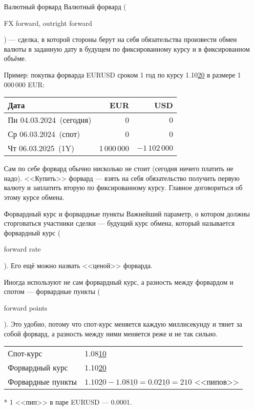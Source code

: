 \documentclass{beamer}
\newcommand{\en}[1]{\begin{otherlanguage}{english}#1\end{otherlanguage}}
\newcommand{\eurusdBigFigures}{1.08}
\newcommand{\eurusdBigFiguresPlusTwo}{1.10}
\newcommand{\eurusdBigFiguresPlusTwoPerMillion}{1\,10}
\newcommand{\eurusdBusinessDate}{Пн 04.03.2024}
\newcommand{\eurusdSpotDate}{Ср 06.03.2024}
\newcommand{\eurusdOneYearDate}{Чт 06.03.2025}
\begin{document}
\begin{frame}{Валютный форвард}
\justify
\alert{Валютный форвард} (\en{FX forward, outright forward}) --- сделка, в которой стороны берут 
на себя обязательства произвести обмен валюты в заданную дату в будущем по 
фиксированному курсу и в фиксированном объёме. 

\justify
Пример: покупка форварда EURUSD сроком 1 год по курсу \eurusdBigFiguresPlusTwo\underline{20} в размере 1\,000\,000 EUR:

\centering
\begin{tabular}{l|r|r}
Дата                          & EUR & USD \\ \hline
\eurusdBusinessDate\ (сегодня)  & 0   & 0   \\
\eurusdSpotDate\ (спот) & 0   & 0   \\
\eurusdOneYearDate\ (1Y)   & 1\,000\,000 & $-\eurusdBigFiguresPlusTwoPerMillion 2\,000$
\end{tabular}

\justify
Сам по себе форвард обычно нисколько не стоит (сегодня ничего платить не надо). <<Купить>> форвард --- взять на себя обязательство получить первую валюту и заплатить вторую по фиксированному курсу. Главное договориться об этому курсе обмена.
\end{frame}



\begin{frame}{Форвардный курс и форвардные пункты}
\justify
Важнейший параметр, о котором должны сторговаться участники сделки --- будущий курс обмена, который называется \alert{форвардный курс} (\en{forward rate}). Его ещё можно назвать <<ценой>> форварда.

\justify
Иногда используют не сам форвардный курс, а разность между форвардом и спотом --- \alert{форвардные пункты} (\en{forward points}). Это удобно, потому что спот-курс меняется каждую миллисекунду и тянет за собой форвард, а разность между ними меняется реже и не так сильно.

\vspace{\baselineskip}
\centering
\begin{tabular}{l|l}
Спот-курс & \eurusdBigFigures\underline{10} \\
Форвардный курс & \eurusdBigFiguresPlusTwo\underline{20} \\
\hline
Форвардные пункты & $\eurusdBigFiguresPlusTwo\underline{20} - \eurusdBigFigures\underline{10} = 0.02\underline{10 }= 210$ <<пипов>>
\end{tabular}

\justify
* 1 <<пип>> в паре EURUSD --- 0.0001.
\end{frame}
\end{document}
